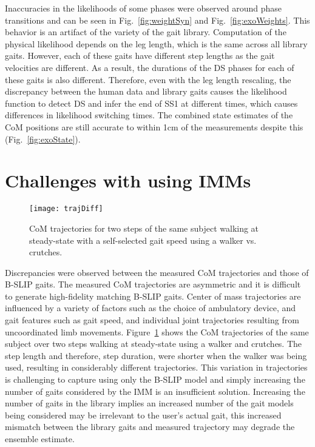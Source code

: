 Inaccuracies in the likelihoods of some phases were observed around phase transitions and can be seen in Fig.~\ref{fig:weightSyn} and Fig.~\ref{fig:exoWeights}. This behavior is an artifact of the variety of the gait library. Computation of the physical likelihood depends on the leg length, which is the same across all library gaits. However, each of these gaits have different step lengths as the gait velocities are different. As a result, the durations of the DS phases for each of these gaits is also different. Therefore, even with the leg length rescaling, the discrepancy between the human data and library gaits causes the likelihood function to detect DS and infer the end of SS1 at different times, which causes differences in likelihood switching times. The combined state estimates of the CoM positions are still accurate to within 1cm of the measurements despite this (Fig.~\ref{fig:exoState}).

\section{Challenges with using IMMs}

\begin{figure}
	\centering
	\texttt{[image: trajDiff]}
	\caption{CoM trajectories for two steps of the same subject walking at steady-state with a self-selected gait speed using a walker vs. crutches.}\label{fig:trajDiff}
\end{figure}
Discrepancies were observed between the measured CoM trajectories and those of B-SLIP gaits. The measured CoM trajectories are asymmetric and it is difficult to generate high-fidelity matching B-SLIP gaits. Center of mass trajectories are influenced by a variety of factors such as the choice of ambulatory device, and gait features such as gait speed, and individual joint trajectories resulting from uncoordinated limb movements. Figure~\ref{fig:trajDiff} shows the CoM trajectories of the same subject over two steps walking at steady-state using a walker and crutches. The step length and therefore, step duration, were shorter when the walker was being used, resulting in considerably different trajectories. This variation in trajectories is challenging to capture using only the B-SLIP model and simply increasing the number of gaits considered by the IMM is an insufficient solution. Increasing the number of gaits in the library implies an increased number of the gait models being considered may be irrelevant to the user's actual gait, this increased mismatch between the library gaits and measured trajectory may degrade the ensemble estimate.

